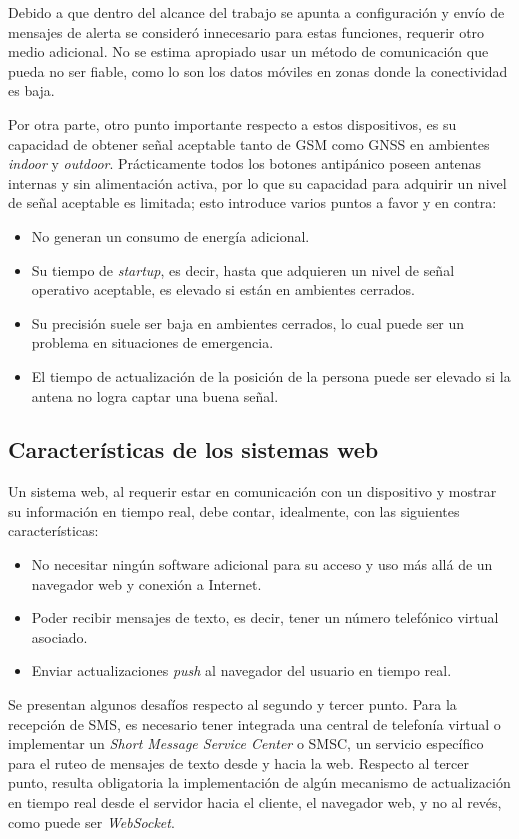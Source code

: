 Debido a que dentro del alcance del trabajo se apunta a configuración y envío de mensajes de alerta se consideró innecesario para estas funciones, requerir otro medio adicional. No se estima apropiado usar un método de comunicación que pueda no ser fiable, como lo son los datos móviles en zonas donde la conectividad es baja.

Por otra parte, otro punto importante respecto a estos dispositivos, es su capacidad de obtener señal aceptable tanto de GSM como GNSS en ambientes \textit{indoor} y \textit{outdoor}. Prácticamente todos los botones antipánico poseen antenas internas y sin alimentación activa, por lo que su capacidad para adquirir un nivel de señal aceptable es limitada; esto introduce varios puntos a favor y en contra:
\begin{itemize}
	\item No generan un consumo de energía adicional.
	\item Su tiempo de \textit{startup}, es decir, hasta que adquieren un nivel de señal operativo aceptable, es elevado si están en ambientes cerrados.
	\item Su precisión suele ser baja en ambientes cerrados, lo cual puede ser un problema en situaciones de emergencia.
	\item El tiempo de actualización de la posición de la persona puede ser elevado si la antena no logra captar una buena señal.
\end{itemize}

\subsection{Características de los sistemas web}

Un sistema web, al requerir estar en comunicación con un dispositivo y mostrar su información en tiempo real, debe contar, idealmente, con las siguientes características:
\begin{itemize}
	\item No necesitar ningún software adicional para su acceso y uso más allá de un navegador web y conexión a Internet.
	\item Poder recibir mensajes de texto, es decir, tener un número telefónico virtual asociado.
	\item Enviar actualizaciones \textit{push} al navegador del usuario en tiempo real.
\end{itemize}

Se presentan algunos desafíos respecto al segundo y tercer punto. Para la recepción de SMS, es necesario tener integrada una central de telefonía virtual o implementar un \textit{Short Message Service Center} o SMSC, un servicio específico para el ruteo de mensajes de texto desde y hacia la web. Respecto al tercer punto, resulta obligatoria la implementación de algún mecanismo de actualización en tiempo real desde el servidor hacia el cliente, el navegador web, y no al revés, como puede ser \textit{WebSocket}.

